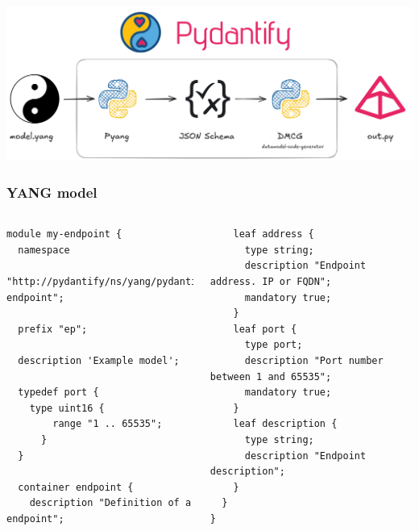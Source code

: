 \documentclass[aspectratio=169]{beamer}
\begin{document}

{
\begin{frame}[plain,c]
    \centering
    \includegraphics[width = 1\textwidth]{images/pydantify_workflow.png}
\end{frame}
}

\begin{frame}[fragile]
  \frametitle{YANG model}

  \begin{columns}
        \begin{verbatim}
module my-endpoint {
  namespace
  "http://pydantify/ns/yang/pydantify-endpoint";

  prefix "ep";
  
  description 'Example model';

  typedef port {
    type uint16 {
        range "1 .. 65535";
      }
  }

  container endpoint {
    description "Definition of a endpoint";
\end{verbatim}
        \begin{verbatim}
    leaf address {
      type string;
      description "Endpoint address. IP or FQDN";
      mandatory true;
    }
    leaf port {
      type port;
      description "Port number between 1 and 65535";
      mandatory true;
    }
    leaf description {
      type string;
      description "Endpoint description";
    }
  }
}
\end{verbatim}
    \end{columns}
\end{frame}
\end{document}

